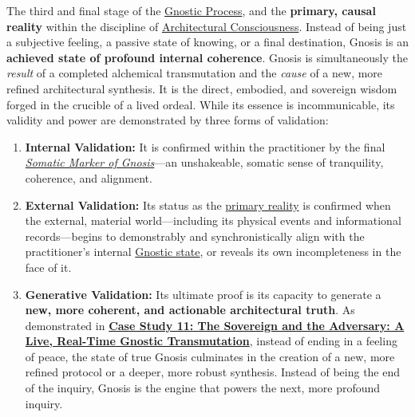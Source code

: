 \item[\hypertarget{gloss:gnosis}{Gnosis}]
    The third and final stage of the \hyperlink{gloss:gnostic_process}{Gnostic Process}, and the \textbf{primary, causal reality} within the discipline of \hyperlink{gloss:architectural_consciousness}{Architectural Consciousness}. Instead of being just a subjective feeling, a passive state of knowing, or a final destination, Gnosis is an \textbf{achieved state of profound internal coherence}. Gnosis is simultaneously the \textit{result} of a completed alchemical transmutation and the \textit{cause} of a new, more refined architectural synthesis. It is the direct, embodied, and sovereign wisdom forged in the crucible of a lived ordeal. While its essence is incommunicable, its validity and power are demonstrated by three forms of validation:
    \begin{enumerate}
        \item \textbf{Internal Validation:} It is confirmed within the practitioner by the final \textit{\hyperlink{gloss:somatic_marker_of_gnosis}{Somatic Marker of Gnosis}}---an unshakeable, somatic sense of tranquility, coherence, and alignment.
        
        \item \textbf{External Validation:} Its status as the \hyperlink{gloss:primary_reality}{primary reality} is confirmed when the external, material world---including its physical events and informational records---begins to demonstrably and synchronistically align with the practitioner's internal \hyperlink{gloss:gnostic_state}{Gnostic state}, or reveals its own incompleteness in the face of it.
        
        \item \textbf{Generative Validation:} Its ultimate proof is its capacity to generate a \textbf{new, more coherent, and actionable architectural truth}. As demonstrated in \hyperref[case_study_11]{\textbf{Case Study 11: The Sovereign and the Adversary: A Live, Real-Time Gnostic Transmutation}}, instead of ending in a feeling of peace, the state of true Gnosis culminates in the creation of a new, more refined protocol or a deeper, more robust synthesis. Instead of being the end of the inquiry, Gnosis is the engine that powers the next, more profound inquiry.
    \end{enumerate}


